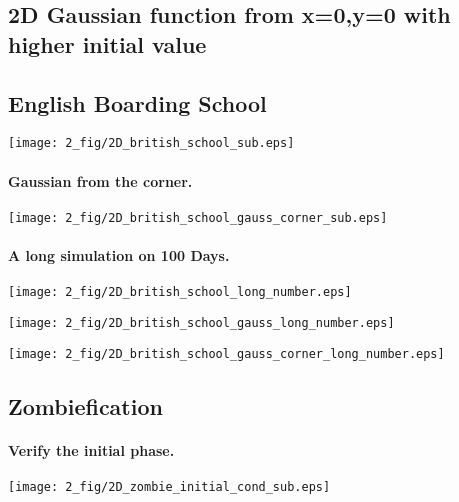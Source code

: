 \documentclass[%
twoside,                 %
final,                   %
chapterprefix=true,      %
open=right               %
10pt]{book}
\begin{document}
\subsection{2D Gaussian function from x=0,y=0 with higher initial value}

\subsection{English Boarding School}


\begin{center}  %
  \centerline{\texttt{[image: 2\_fig/2D\_british\_school\_sub.eps]}}
\end{center}


\paragraph{Gaussian from the corner.}
\begin{center}  %
  \centerline{\texttt{[image: 2\_fig/2D\_british\_school\_gauss\_corner\_sub.eps]}}
\end{center}


\paragraph{A long simulation on 100 Days.}
\begin{center}  %
  \centerline{\texttt{[image: 2\_fig/2D\_british\_school\_long\_number.eps]}}
\end{center}



\begin{center}  %
  \centerline{\texttt{[image: 2\_fig/2D\_british\_school\_gauss\_long\_number.eps]}}
\end{center}



\begin{center}  %
  \centerline{\texttt{[image: 2\_fig/2D\_british\_school\_gauss\_corner\_long\_number.eps]}}
\end{center}


\subsection{Zombiefication}
\paragraph{Verify the initial phase.}
\begin{center}  %
  \centerline{\texttt{[image: 2\_fig/2D\_zombie\_initial\_cond\_sub.eps]}}
\end{center}
\end{document}
